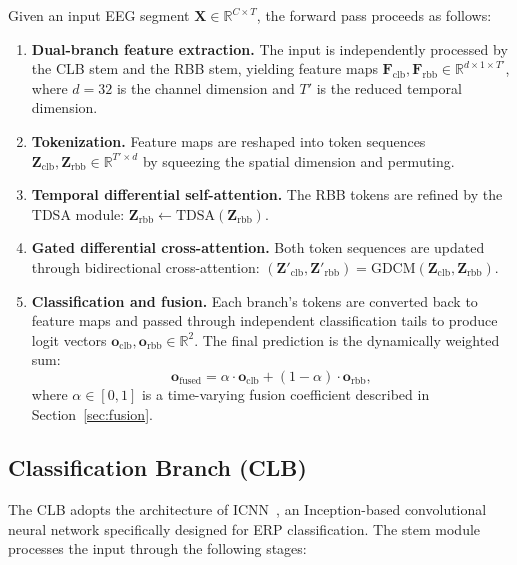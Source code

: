 Given an input EEG segment $\mathbf{X} \in \mathbb{R}^{C \times T}$, the forward pass proceeds as follows:
\begin{enumerate}
    \item \textbf{Dual-branch feature extraction.} The input is independently processed by the CLB stem and the RBB stem, yielding feature maps $\mathbf{F}_{\text{clb}}, \mathbf{F}_{\text{rbb}} \in \mathbb{R}^{d \times 1 \times T'}$, where $d = 32$ is the channel dimension and $T'$ is the reduced temporal dimension.
    \item \textbf{Tokenization.} Feature maps are reshaped into token sequences $\mathbf{Z}_{\text{clb}}, \mathbf{Z}_{\text{rbb}} \in \mathbb{R}^{T' \times d}$ by squeezing the spatial dimension and permuting.
    \item \textbf{Temporal differential self-attention.} The RBB tokens are refined by the TDSA module: $\mathbf{Z}_{\text{rbb}} \leftarrow \text{TDSA}(\mathbf{Z}_{\text{rbb}})$.
    \item \textbf{Gated differential cross-attention.} Both token sequences are updated through bidirectional cross-attention: $(\mathbf{Z}'_{\text{clb}}, \mathbf{Z}'_{\text{rbb}}) = \text{GDCM}(\mathbf{Z}_{\text{clb}}, \mathbf{Z}_{\text{rbb}})$.
    \item \textbf{Classification and fusion.} Each branch's tokens are converted back to feature maps and passed through independent classification tails to produce logit vectors $\mathbf{o}_{\text{clb}}, \mathbf{o}_{\text{rbb}} \in \mathbb{R}^2$. The final prediction is the dynamically weighted sum:
    \begin{equation}\label{eq:fusion}
        \mathbf{o}_{\text{fused}} = \alpha \cdot \mathbf{o}_{\text{clb}} + (1 - \alpha) \cdot \mathbf{o}_{\text{rbb}},
    \end{equation}
    where $\alpha \in [0, 1]$ is a time-varying fusion coefficient described in Section~\ref{sec:fusion}.
\end{enumerate}


\subsection{Classification Branch (CLB)}\label{sec:clb}

The CLB adopts the architecture of ICNN~\cite{santamaria2020icnn}, an Inception-based convolutional neural network specifically designed for ERP classification. The stem module processes the input through the following stages:

